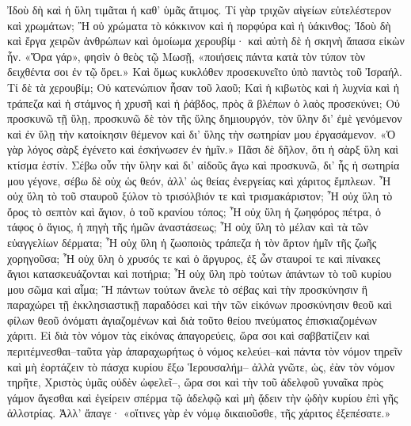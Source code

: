 \documentclass[10pt]{book}
\newcommand{\switchEnglish}{\selectlanguage{english} \switchcolumn}
\begin{document}
\begin{paracol}{2}
Ἰδοὺ δὴ καὶ ἡ ὕλη τιμᾶται ἡ καθ’ ὑμᾶς ἄτιμος. Τί γὰρ τριχῶν αἰγείων
εὐτελέστερον καὶ χρωμάτων; Ἢ οὐ χρώματα τὸ κόκκινον καὶ ἡ πορφύρα καὶ ἡ
ὑάκινθος; Ἰδοὺ δὴ καὶ ἔργα χειρῶν ἀνθρώπων καὶ ὁμοίωμα χερουβίμ· καὶ αὐτὴ
δὲ ἡ σκηνὴ ἅπασα εἰκὼν ἦν. «Ὅρα γάρ», φησὶν ὁ θεὸς τῷ Μωσῇ, «ποιήσεις πάντα
κατὰ τὸν τύπον τὸν δειχθέντα σοι ἐν τῷ ὄρει.» Καὶ ὅμως κυκλόθεν
προσεκυνεῖτο ὑπὸ παντὸς τοῦ Ἰσραήλ. Τί δὲ τὰ χερουβίμ; Οὐ κατενώπιον ἦσαν
τοῦ λαοῦ; Καὶ ἡ κιβωτὸς καὶ ἡ λυχνία καὶ ἡ τράπεζα καὶ ἡ στάμνος ἡ χρυσῆ
καὶ ἡ ῥάβδος, πρὸς ἃ βλέπων ὁ λαὸς προσεκύνει; Οὐ προσκυνῶ τῇ ὕλῃ, προσκυνῶ
δὲ τὸν τῆς ὕλης δημιουργόν, τὸν ὕλην δι’ ἐμὲ γενόμενον καὶ ἐν ὕλῃ τὴν
κατοίκησιν θέμενον καὶ δι’ ὕλης τὴν σωτηρίαν μου ἐργασάμενον. «Ὁ γὰρ λόγος
σὰρξ ἐγένετο καὶ ἐσκήνωσεν ἐν ἡμῖν.» Πᾶσι δὲ δῆλον, ὅτι ἡ σὰρξ ὕλη καὶ
κτίσμα ἐστίν. Σέβω οὖν τὴν ὕλην καὶ δι’ αἰδοῦς ἄγω καὶ προσκυνῶ, δι’ ἧς ἡ
σωτηρία μου γέγονε, σέβω δὲ οὐχ ὡς θεόν, ἀλλ’ ὡς θείας ἐνεργείας καὶ
χάριτος ἔμπλεων. Ἦ οὐχ ὕλη τὸ τοῦ σταυροῦ ξύλον τὸ τρισόλβιόν τε καὶ
τρισμακάριστον; Ἦ οὐχ ὕλη τὸ ὄρος τὸ σεπτὸν καὶ ἅγιον, ὁ τοῦ κρανίου τόπος;
Ἦ οὐχ ὕλη ἡ ζωηφόρος πέτρα, ὁ τάφος ὁ ἅγιος, ἡ πηγὴ τῆς ἡμῶν ἀναστάσεως; Ἦ
οὐχ ὕλη τὸ μέλαν καὶ τὰ τῶν εὐαγγελίων δέρματα; Ἦ οὐχ ὕλη ἡ ζωοποιὸς
τράπεζα ἡ τὸν ἄρτον ἡμῖν τῆς ζωῆς χορηγοῦσα; Ἦ οὐχ ὕλη ὁ χρυσός τε καὶ ὁ
ἄργυρος, ἐξ ὧν σταυροί τε καὶ πίνακες ἅγιοι κατασκευάζονται καὶ ποτήρια; Ἦ
οὐχ ὕλη πρὸ τούτων ἁπάντων τὸ τοῦ κυρίου μου σῶμα καὶ αἷμα; Ἢ πάντων τούτων
ἄνελε τὸ σέβας καὶ τὴν προσκύνησιν ἢ παραχώρει τῇ ἐκκλησιαστικῇ παραδόσει
καὶ τὴν τῶν εἰκόνων προσκύνησιν θεοῦ καὶ φίλων θεοῦ ὀνόματι ἁγιαζομένων καὶ
διὰ τοῦτο θείου πνεύματος ἐπισκιαζομένων χάριτι. Εἰ διὰ τὸν νόμον τὰς
εἰκόνας ἀπαγορεύεις, ὥρα σοι καὶ σαββατίζειν καὶ περιτέμνεσθαι–ταῦτα γὰρ
ἀπαραχωρήτως ὁ νόμος κελεύει–καὶ πάντα τὸν νόμον τηρεῖν καὶ μὴ ἑορτάζειν τὸ
πάσχα κυρίου ἔξω Ἱερουσαλήμ– ἀλλὰ γνῶτε, ὡς, ἐὰν τὸν νόμον τηρῆτε, Χριστὸς
ὑμᾶς οὐδὲν ὠφελεῖ–, ὥρα σοι καὶ τὴν τοῦ ἀδελφοῦ γυναῖκα πρὸς γάμον ἄγεσθαι
καὶ ἐγείρειν σπέρμα τῷ ἀδελφῷ καὶ μὴ ᾄδειν τὴν ᾠδὴν κυρίου ἐπὶ γῆς
ἀλλοτρίας. Ἀλλ’ ἄπαγε· «οἵτινες γὰρ ἐν νόμῳ δικαιοῦσθε, τῆς χάριτος
ἐξεπέσατε.»

\switchEnglish


\end{paracol}
\end{document}
